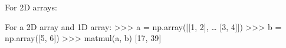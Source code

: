 \documentclass[letterpaper,10pt,english]{sphinxmanual}
\begin{document}
\begin{fulllineitems}
For 2\sphinxhyphen{}D arrays:

\begin{sphinxVerbatim}[commandchars=\\\{\}]
  \PYG{p}{[}\PYG{p}{[} \PYG{p}{]}
              \PYG{p}{[} \PYG{p}{]}\PYG{p}{]}
  \PYG{p}{[}\PYG{p}{[} \PYG{p}{]}
              \PYG{p}{[} \PYG{p}{]}\PYG{p}{]}
 
\end{sphinxVerbatim}

For a 2\sphinxhyphen{}D array and 1\sphinxhyphen{}D array:
\textgreater{}\textgreater{}\textgreater{} a = np.array({[}{[}1, 2{]},
…               {[}3, 4{]}{]})
\textgreater{}\textgreater{}\textgreater{} b = np.array({[}5, 6{]})
\textgreater{}\textgreater{}\textgreater{} matmul(a, b)
{[}17, 39{]}

\end{fulllineitems}
\end{document}

